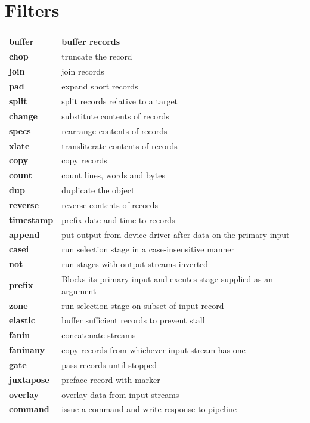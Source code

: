 \chapter{Filters}
\begin{tabularx}{\textwidth}{>{\bfseries}lX}
\toprule
buffer&buffer records
\\\midrule
chop&truncate the record
\\\midrule
join&join records
\\\midrule
pad&expand short records
\\\midrule
split&split records relative to a target
\\\midrule
change&substitute contents of records
\\\midrule
specs&rearrange contents of records
\\\midrule
xlate&transliterate contents of records
\\\midrule
copy&copy records
\\\midrule
count&count lines, words and bytes
\\\midrule
dup&duplicate the object
\\\midrule
reverse&reverse contents of records
\\\midrule
timestamp&prefix date and time to records
\\\midrule
append&put output from device driver after data on the primary input
\\\midrule
casei&run selection stage in a case-insensitive manner
\\\midrule
not&run stages with output streams inverted
\\\midrule
prefix&Blocks its primary input and excutes stage supplied as an argument
\\\midrule
zone&run selection stage on subset of input record
\\\midrule
elastic&buffer sufficient records to prevent stall
\\\midrule
fanin&concatenate streams
\\\midrule
faninany&copy records from whichever input stream has one
\\\midrule
gate&pass records until stopped
\\\midrule
juxtapose&preface record with marker
\\\midrule
overlay&overlay data from input streams
\\\midrule
command&issue a command and write response to pipeline
\\\bottomrule
\end{tabularx}


